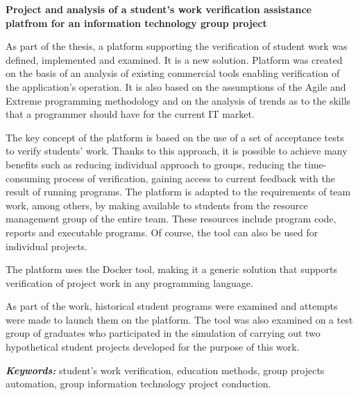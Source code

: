 \vfill

\pagebreak

\begin{center}
    \textbf{Project and analysis of a student's work verification assistance platfrom for an information technology group project}
\end{center}
 \newline

As part of the thesis, a platform supporting the verification of student work was defined, implemented and examined.
It is a new solution.
Platform was created on the basis of an analysis of existing commercial tools enabling verification of the application's operation.
It is also based on the assumptions of the Agile and Extreme programming methodology and on the analysis of trends as to the skills that a programmer should have for the current IT market.

The key concept of the platform is based on the use of a set of acceptance tests to verify students' work.
Thanks to this approach, it is possible to achieve many benefits such as reducing individual approach to groups, reducing the time-consuming process of verification, gaining access to current feedback with the result of running programs.
The platform is adapted to the requirements of team work, among others, by making available to students from the resource management group of the entire team.
These resources include program code, reports and executable programs.
Of course, the tool can also be used for individual projects.

The platform uses the Docker tool, making it a generic solution that supports verification of project work in any programming language.

As part of the work, historical student programs were examined and attempts were made to launch them on the platform.
The tool was also examined on a test group of graduates who participated in the simulation of carrying out two hypothetical student projects developed for the purpose of this work.\newline


\textit{\textbf{Keywords:}} student's work verification, education methods, group projects automation, group information technology project conduction.


\vfill


\cleardoublepage

